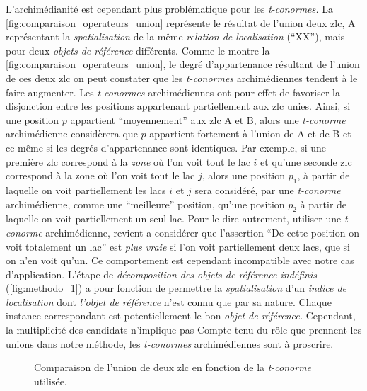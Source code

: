 L'archimédianité est cependant plus problématique pour les
\emph{t-conormes.} La \autoref{fig:comparaison_operateurs_union}
représente le résultat de l'union deux \ac{zlc},
\textcolor{RdBu-9-1}{\textsf{A}} représentant la \emph{spatialisation}
de la même \emph{relation de localisation} (\enquote{XX}), mais pour
deux \emph{objets de référence} différents. Comme le montre la
\autoref{fig:comparaison_operateurs_union}, le degré d'appartenance
résultant de l'union de ces deux \ac{zlc} on peut constater que les
\emph{t-conormes} archimédiennes tendent à le faire augmenter.
%
Les \emph{t-conormes} archimédiennes ont pour effet de favoriser la
disjonction entre les positions appartenant partiellement aux \ac{zlc}
unies. Ainsi, si une position \(p\) appartient \enquote{moyennement}
aux \ac{zlc} \textcolor{RdBu-9-1}{\textsf{A}} et
\textcolor{RdBu-9-9}{\textsf{B}}, alors une \emph{t-conorme}
archimédienne considèrera que \(p\) appartient fortement à l'union de
\textcolor{RdBu-9-1}{\textsf{A}} et de
\textcolor{RdBu-9-9}{\textsf{B}} et ce même si les degrés
d'appartenance sont identiques. Par exemple, si une première \ac{zlc}
correspond à la \emph{zone} où l'on voit tout le lac \(i\) et qu'une
seconde \ac{zlc} correspond à la zone où l'on voit tout le lac \(j\),
alors une position \(p_1\), à partir de laquelle on voit partiellement
les lacs \(i\) et \(j\) sera considéré, par une \emph{t-conorme}
archimédienne, comme une \enquote{meilleure} position, qu'une position
\(p_2\) à partir de laquelle on voit partiellement un seul lac. Pour
le dire autrement, utiliser une \emph{t-conorme} archimédienne,
revient a considérer que l'assertion \enquote{De cette position on
  voit totalement un lac} est \emph{plus vraie} si l'on voit
partiellement deux lacs, que si on n'en voit qu'un. Ce comportement
est cependant incompatible avec notre cas d'application.
%
L'étape de \emph{décomposition des objets de référence indéfinis}
(\autoref{fig:methodo_1}) a pour fonction de permettre la
\emph{spatialisation} d'un \emph{indice de localisation} dont
\emph{l'objet de référence} n'est connu que par sa nature. Chaque
instance correspondant est potentiellement le bon \emph{objet de
  référence.} Cependant, la multiplicité des candidats n'implique pas
%
Compte-tenu du rôle que prennent les unions dans notre méthode, les
\emph{t-conormes} archimédiennes sont à proscrire.

\begin{figure}
  \centering
  
  \caption{Comparaison de l'union de deux \ac{zlc} en fonction de la
    \emph{t-conorme} utilisée.}
  \label{fig:comparaison_operateurs_union}
\end{figure}

